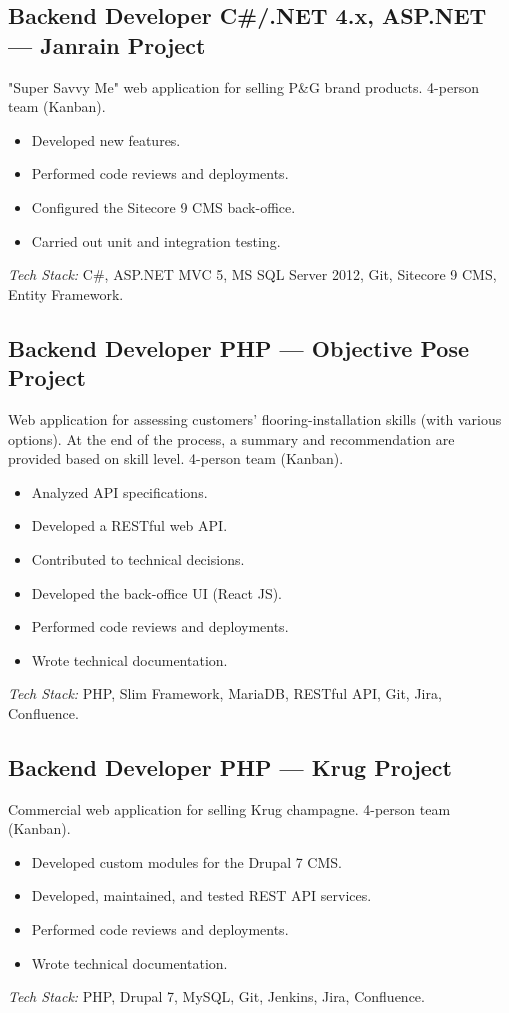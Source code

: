 \documentclass[10pt,a4paper]{article}
\begin{document}
\vspace{6pt}

\subsection*{Backend Developer C\#/.NET 4.x, ASP.NET --- Janrain Project}
\color{darkgray}
"Super Savvy Me" web application for selling P\&G brand products. 4-person team (Kanban).
\begin{itemize}
  \item Developed new features.
  \item Performed code reviews and deployments.
  \item Configured the Sitecore 9 CMS back-office.
  \item Carried out unit and integration testing.
\end{itemize}
\textit{Tech Stack:} C\#, ASP.NET MVC 5, MS SQL Server 2012, Git, Sitecore 9 CMS, Entity Framework.

\vspace{6pt}

\subsection*{Backend Developer PHP --- Objective Pose Project}
\color{darkgray}
Web application for assessing customers' flooring-installation skills (with various options). At the end of the process, a summary and recommendation are provided based on skill level. 4-person team (Kanban).
\begin{itemize}
  \item Analyzed API specifications.
  \item Developed a RESTful web API.
  \item Contributed to technical decisions.
  \item Developed the back-office UI (React JS).
  \item Performed code reviews and deployments.
  \item Wrote technical documentation.
\end{itemize}
\textit{Tech Stack:} PHP, Slim Framework, MariaDB, RESTful API, Git, Jira, Confluence.

\vspace{6pt}

\subsection*{Backend Developer PHP --- Krug Project}
\color{darkgray}
Commercial web application for selling Krug champagne. 4-person team (Kanban).
\begin{itemize}
  \item Developed custom modules for the Drupal 7 CMS.
  \item Developed, maintained, and tested REST API services.
  \item Performed code reviews and deployments.
  \item Wrote technical documentation.
\end{itemize}
\textit{Tech Stack:} PHP, Drupal 7, MySQL, Git, Jenkins, Jira, Confluence.
\end{document}
